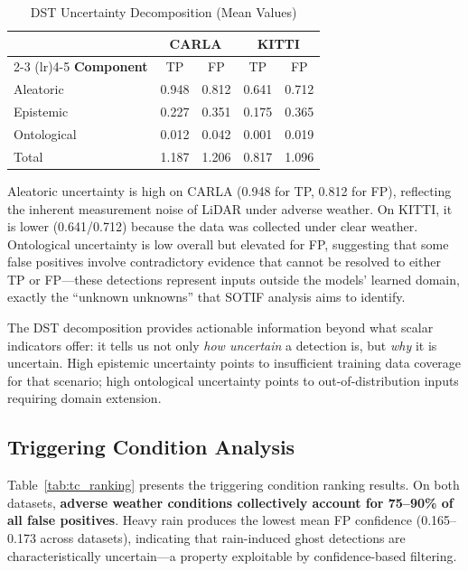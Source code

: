 \documentclass[conference]{IEEEtran}
\begin{document}
\begin{table}[t]
\caption{DST Uncertainty Decomposition (Mean Values)}
\label{tab:dst}
\centering
\small
\begin{tabular}{lcccc}
\toprule
& \multicolumn{2}{c}{\textbf{CARLA}} & \multicolumn{2}{c}{\textbf{KITTI}} \\
\cmidrule(lr){2-3} \cmidrule(lr){4-5}
\textbf{Component} & TP & FP & TP & FP \\
\midrule
Aleatoric & 0.948 & 0.812 & 0.641 & 0.712 \\
Epistemic & 0.227 & 0.351 & 0.175 & 0.365 \\
Ontological & 0.012 & 0.042 & 0.001 & 0.019 \\
Total & 1.187 & 1.206 & 0.817 & 1.096 \\
\bottomrule
\end{tabular}
\end{table}

Aleatoric uncertainty is high on CARLA (0.948 for TP, 0.812 for FP), reflecting the inherent measurement noise of LiDAR under adverse weather. On KITTI, it is lower (0.641/0.712) because the data was collected under clear weather. Ontological uncertainty is low overall but elevated for FP, suggesting that some false positives involve contradictory evidence that cannot be resolved to either TP or FP---these detections represent inputs outside the models' learned domain, exactly the ``unknown unknowns'' that SOTIF analysis aims to identify.

The DST decomposition provides actionable information beyond what scalar indicators offer: it tells us not only \emph{how uncertain} a detection is, but \emph{why} it is uncertain. High epistemic uncertainty points to insufficient training data coverage for that scenario; high ontological uncertainty points to out-of-distribution inputs requiring domain extension.

\subsection{Triggering Condition Analysis}

Table~\ref{tab:tc_ranking} presents the triggering condition ranking results. On both datasets, \textbf{adverse weather conditions collectively account for 75--90\% of all false positives}. Heavy rain produces the lowest mean FP confidence (0.165--0.173 across datasets), indicating that rain-induced ghost detections are characteristically uncertain---a property exploitable by confidence-based filtering.
\end{document}
